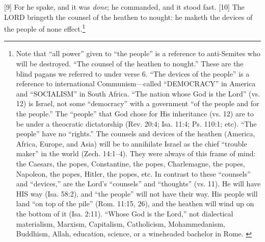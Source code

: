 [9] \textcolor[rgb]{0.00,0.00,1.00}{For he spake, and it was \emph{done}; he commanded, and it stood fast.}
[10] \textcolor[rgb]{0.00,0.00,1.00}{The LORD bringeth the counsel of the heathen to nought: he maketh the devices of the people of none effect.}\footnote{Note that “all power” given to “the people” is a reference to anti-Semites who will be destroyed. “The counsel of the heathen to nought.” These are the blind pagans we referred to under verse 6. “The devices of the people” is a reference to international Communism—called “DEMOCRACY” in America and “SOCIALISM” in South Africa. “The nation whose God is the Lord” (vs. 12) is Israel, not some “democracy” with a government “of the people and for the people.” The “people” that God chose for His inheritance (vs. 12) are to be under a theocratic dictatorship (Rev. 20:4; Isa. 11:4; Ps. 110:1; etc). “The people” have no “rights.” The counsels and devices of the heathen (America, Africa, Europe, and Asia) will be to annihilate Israel as the chief “trouble maker” in the world (Zech. 14:1–4). They were always of this frame of mind: the Caesars, the popes, Constantine, the popes, Charlemagne, the popes, Napoleon, the popes, Hitler, the popes, etc. In contrast to these “counsels” and “devices,” are the Lord’s “counsels” and “thoughts” (vs. 11). He will have HIS way (Isa. 58:2), and “the people” will not have their way. His people will land “on top of the pile” (Rom. 11:15, 26), and the heathen will wind up on the bottom of it (Isa. 2:11). “Whose God is the Lord,” not dialectical materialism, Marxism, Capitalism, Catholicism, Mohammedanism, Buddhism, Allah, education, science, or a wineheaded bachelor in Rome.  \cite{Ruckman1992Psalms} }
